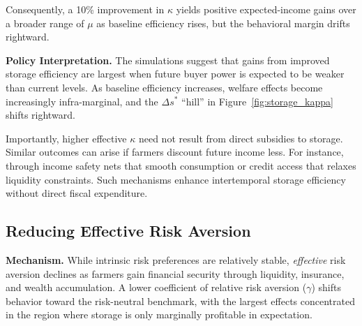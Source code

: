 Consequently, a 10\% improvement in $\kappa$ yields positive expected-income gains over a broader range of $\mu$ as baseline efficiency rises, but the behavioral margin drifts rightward.


\textbf{Policy Interpretation.} 
The simulations suggest that gains from improved storage efficiency are largest when future buyer power is expected to be weaker than current levels. As baseline efficiency increases, welfare effects become increasingly infra-marginal, and the $\Delta s^*$ ``hill'' in Figure~\ref{fig:storage_kappa} shifts rightward. 

Importantly, higher effective $\kappa$ need not result from direct subsidies to storage. Similar outcomes can arise if farmers discount future income less. For instance, through income safety nets that smooth consumption or credit access that relaxes liquidity constraints. Such mechanisms enhance intertemporal storage efficiency without direct fiscal expenditure.







\subsection{Reducing Effective Risk Aversion}

\textbf{Mechanism.} While intrinsic risk preferences are relatively stable, \emph{effective} risk aversion declines as farmers gain financial security through liquidity, insurance, and wealth accumulation. A lower coefficient of relative risk aversion ($\gamma$) shifts behavior toward the risk-neutral benchmark, with the largest effects concentrated in the region where storage is only marginally profitable in expectation.


